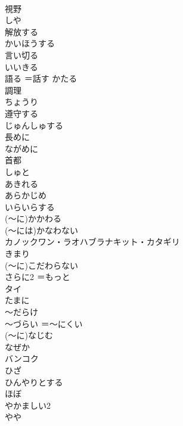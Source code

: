 \documentclass[8pt]{extreport}
\begin{document}
\begin{CJK}{UTF8}{min}
\\	視野	
\\	しや
\\	解放する	
\\	かいほうする
\\	言い切る	
\\	いいきる
\\	語る	＝話す	かたる
\\	調理	
\\	ちょうり
\\	遵守する	
\\	じゅんしゅする
\\	長めに	
\\	ながめに
\\	首都	
\\	しゅと
\\	あきれる	
\\	あらかじめ	
\\	いらいらする	
\\	(～に)かかわる	
\\	(～には)かなわない	
\\	カノックワン・ラオハブラナキット・カタギリ	
\\	きまり	
\\	(～に)こだわらない	
\\	さらに2	＝もっと	
\\	タイ	
\\	たまに	
\\	～だらけ	
\\	～づらい	＝～にくい	
\\	(～に)なじむ	
\\	なぜか	
\\	バンコク	
\\	ひざ	
\\	ひんやりとする	
\\	ほぼ	
\\	やかましい2	
\\	やや	
\end{CJK}
\end{document}
